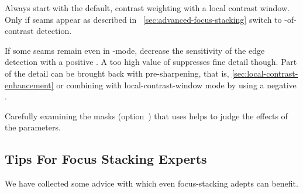 Always start with the default, contrast weighting with a local contrast window.  Only if seams
appear as described in \sectionName~\ref{sec:advanced-focus-stacking} switch to
-of- contrast detection.

If some seams remain even in -mode, decrease the sensitivity of the edge detection
with a positive .  A too high value of
 suppresses fine detail though.  Part of the detail can
be brought back with pre-sharpening, that is, \ref{sec:local-contrast-enhancement} or combining
 with local-contrast-window mode by using a negative .

Carefully examining the masks (option~) that \App{} uses helps to judge the
effects of the parameters.


\subsection[Tips For Focus Stacking Experts]{\label{sec:tips-for-focus-stacking-experts}%
  Tips For Focus Stacking Experts}

We have collected some advice with which even focus-stacking adepts can benefit.

